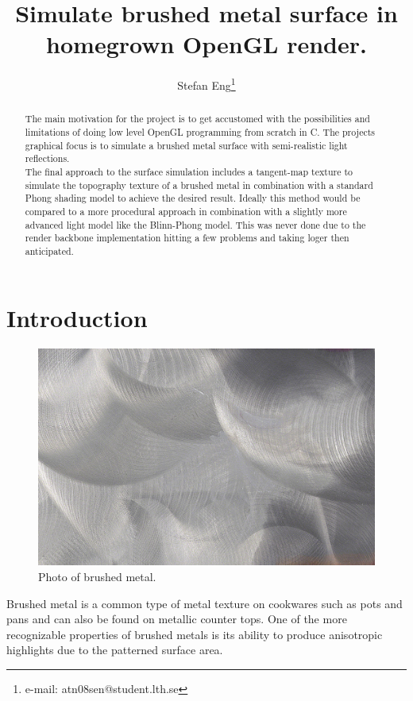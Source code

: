 \documentclass{acmsiggraph}               %
\title{Simulate brushed metal surface in homegrown OpenGL render.}
\author{Stefan Eng\thanks{e-mail: atn08sen@student.lth.se}
}
\affiliation{Lund University\\ Sweden}
\begin{document}
\ifpdf
\else
\fi


\maketitle

\begin{abstract}
The main motivation for the project is to get accustomed with the possibilities
and limitations of doing low level OpenGL programming from scratch in C. The projects
graphical focus is to simulate a brushed metal surface with semi-realistic light
reflections. \\

The final approach to the surface simulation includes a tangent-map texture to
simulate the topography texture of a brushed metal in combination with a
standard Phong shading model\cite{wiki_phong} to achieve the desired result.
Ideally this method would be compared to a more procedural approach in
combination with a slightly more advanced light model like the Blinn-Phong
model\cite{wiki_blinn}. This was never done due to the render backbone
implementation hitting a few problems and taking loger then anticipated.

\end{abstract}


\section{Introduction}

\begin{figure}[!ht]
    \centering
    \includegraphics[width=0.7\columnwidth]{brushed.jpg}
    \caption{Photo of brushed metal.}
    \label{brushed_real}
\end{figure}

Brushed metal is a common type of metal texture on cookwares such as pots and
pans and can also be found on metallic counter tops. One of the more
recognizable properties of brushed metals is its ability to produce anisotropic
highlights due to the patterned surface area. \\
\end{document}
